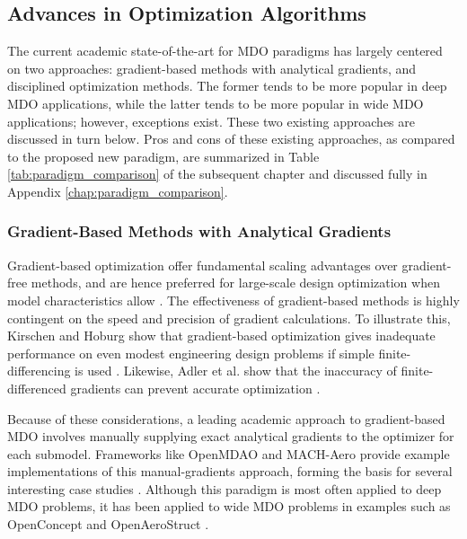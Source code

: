 \subsection{Advances in Optimization Algorithms}

The current academic state-of-the-art for MDO paradigms has largely centered on two approaches: gradient-based methods with analytical gradients, and disciplined optimization methods. The former tends to be more popular in deep MDO applications, while the latter tends to be more popular in wide MDO applications; however, exceptions exist. These two existing approaches are discussed in turn below. Pros and cons of these existing approaches, as compared to the proposed new paradigm, are summarized in Table \ref{tab:paradigm_comparison} of the subsequent chapter and discussed fully in Appendix \ref{chap:paradigm_comparison}.

\subsubsection{Gradient-Based Methods with Analytical Gradients}

Gradient-based optimization offer fundamental scaling advantages over gradient-free methods, and are hence preferred for large-scale design optimization when model characteristics allow \cite{lyu_benchmarking_2014, martins_engineering_2021}. The effectiveness of gradient-based methods is highly contingent on the speed and precision of gradient calculations. To illustrate this, Kirschen and Hoburg show that gradient-based optimization gives inadequate performance on even modest engineering design problems if simple finite-differencing is used \cite{kirschen}. Likewise, Adler et al. show that the inaccuracy of finite-differenced gradients can prevent accurate optimization \cite{adler_cfd_2022}.

Because of these considerations, a leading academic approach to gradient-based MDO involves manually supplying exact analytical gradients to the optimizer for each submodel. Frameworks like OpenMDAO and MACH-Aero \cite{gray_openmdao_2019} provide example implementations of this manual-gradients approach, forming the basis for several interesting case studies \cite{yildirim_performance_2021, brelje_multidisciplinary_2021, openaerostruct, bons_highfidelity_2020}. Although this paradigm is most often applied to deep MDO problems, it has been applied to wide MDO problems in examples such as OpenConcept \cite{brelje_multidisciplinary_2021} and OpenAeroStruct \cite{openaerostruct}.

